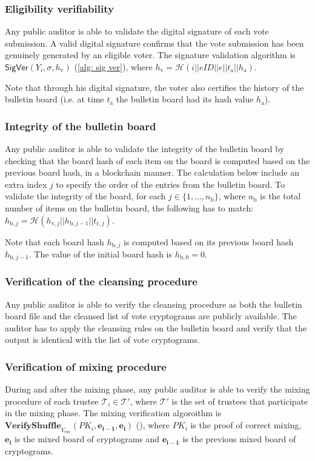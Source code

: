  
\subsubsection{Eligibility verifiability}
Any public auditor is able to validate the digital signature of each vote submission. A valid digital signature confirms that the vote submission has been genuinely generated by an eligible voter. The signature validation algorithm is \( \mathsf{SigVer} (Y_i, \sigma, h_\mathrm{v}) \) (\cref{alg: sig ver}), where \( h_\mathrm{v} = \mathcal{H}( i || eID || e || t_\mathrm{a} || h_\mathrm{a}) \).

Note that through his digital signature, the voter also certifies the history of the bulletin board (i.e. at time $t_\mathrm{a}$ the bulletin board had its hash value $h_\mathrm{a}$).


\subsubsection{Integrity of the bulletin board}
Any public auditor is able to validate the integrity of the bulletin board by checking that the board hash of each item on the board is computed based on the previous board hash, in a blockchain manner. The calculation below include an extra index $j$ to specify the order of the entries from the bulletin board. To validate the integrity of the board, for each \( j \in \{ 1, ..., n_\mathrm{b} \} \), where $n_\mathrm{b}$ is the total number of items on the bulletin board, the following has to match: \( h_{\mathrm{b},j} = \mathcal{H}(h_{\mathrm{v},j} || h_{\mathrm{b},j-1} || t_{\mathrm{r},j}) \).

Note that each board hash $h_{\mathrm{b},j}$ is computed based on its previous board hash $h_{\mathrm{b},j-1}$. The value of the initial board hash is \( h_{\mathrm{b},0} = 0 \).


\subsubsection{Verification of the cleansing procedure}
Any public auditor is able to verify the cleansing procedure as both the bulletin board file and the cleansed list of vote cryptograms are publicly available. The auditor has to apply the cleansing rules on the bulletin board and verify that the output is identical with the list of vote cryptograms.


\subsubsection{Verification of mixing procedure}
During and after the mixing phase, any public auditor is able to verify the mixing procedure of each trustee $\mathcal{T}_i \in \boldsymbol{\mathcal{T}'}$, where $\boldsymbol{\mathcal{T}'}$ is the set of trustees that participate in the mixing phase. The mixing verification algoroithm is \( \mathbf{VerifyShuffle}_{Y_\mathrm{enc}} (PK_i, \boldsymbol{e_{i-1}}, \boldsymbol{e_i}) \) (), where $PK_i$ is the proof of correct mixing, $\boldsymbol{e_i}$ is the mixed board of cryptograms and $\boldsymbol{e_{i-1}}$ is the previous mixed board of cryptograms.

